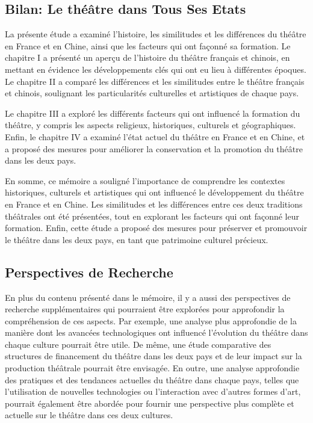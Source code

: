 \documentclass[UTF8,a4paper,12pt]{ctexart}
\numberwithin{equation}{section}
\begin{document}
\subsection*{Bilan: Le théâtre dans Tous Ses Etats}
La présente étude a examiné l'histoire, les similitudes et les différences du théâtre en France et en Chine, ainsi que les facteurs qui ont façonné sa formation. Le chapitre I a présenté un aperçu de l'histoire du théâtre français et chinois, en mettant en évidence les développements clés qui ont eu lieu à différentes époques. Le chapitre II a comparé les différences et les similitudes entre le théâtre français et chinois, soulignant les particularités culturelles et artistiques de chaque pays.

Le chapitre III a exploré les différents facteurs qui ont influencé la formation du théâtre, y compris les aspects religieux, historiques, culturels et géographiques. Enfin, le chapitre IV a examiné l'état actuel du théâtre en France et en Chine, et a proposé des mesures pour améliorer la conservation et la promotion du théâtre dans les deux pays.

En somme, ce mémoire a souligné l'importance de comprendre les contextes historiques, culturels et artistiques qui ont influencé le développement du théâtre en France et en Chine. Les similitudes et les différences entre ces deux traditions théâtrales ont été présentées, tout en explorant les facteurs qui ont façonné leur formation. Enfin, cette étude a proposé des mesures pour préserver et promouvoir le théâtre dans les deux pays, en tant que patrimoine culturel précieux.

\subsection*{Perspectives de Recherche}
En plus du contenu présenté dans le mémoire, il y a aussi des perspectives de recherche supplémentaires qui pourraient être explorées pour approfondir la compréhension de ces aspects. Par exemple, une analyse plus approfondie de la manière dont les avancées technologiques ont influencé l'évolution du théâtre dans chaque culture pourrait être utile. De même, une étude comparative des structures de financement du théâtre dans les deux pays et de leur impact sur la production théâtrale pourrait être envisagée. En outre, une analyse approfondie des pratiques et des tendances actuelles du théâtre dans chaque pays, telles que l'utilisation de nouvelles technologies ou l'interaction avec d'autres formes d'art, pourrait également être abordée pour fournir une perspective plus complète et actuelle sur le théâtre dans ces deux cultures.
\end{document}
